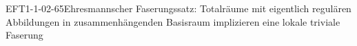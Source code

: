 
\begin{PROP}{EFT1-1-02-65}{Ehresmannscher Faserungssatz: Totalräume mit eigentlich regulären Abbildungen in zusammenhängenden Basisraum implizieren eine lokale triviale Faserung}
\end{PROP}
